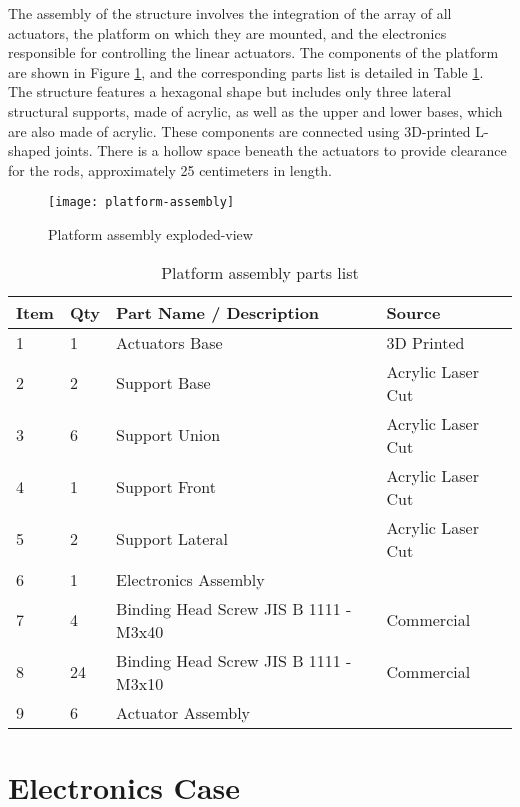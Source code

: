 The assembly of the structure involves the integration of the array of all actuators, the platform on which they are mounted, and the electronics responsible for controlling the linear actuators. The components of the platform are shown in Figure \ref{fig:platform-assembly}, and the corresponding parts list is detailed in Table \ref{tab:platform-assembly}. The structure features a hexagonal shape but includes only three lateral structural supports, made of acrylic, as well as the upper and lower bases, which are also made of acrylic. These components are connected using 3D-printed L-shaped joints. There is a hollow space beneath the actuators to provide clearance for the rods, approximately 25 centimeters in length.


\begin{figure}
    \centering
    \texttt{[image: platform-assembly]}
    \caption{Platform assembly exploded-view}
    \label{fig:platform-assembly}
\end{figure}

\begin{table}[]
    \centering
    \caption{Platform assembly parts list}
    \label{tab:platform-assembly}
    \begin{tabular}{llll}
    \toprule
    Item & Qty & Part Name / Description & Source \\
    \midrule
    1 & 1 & Actuators Base & 3D Printed \\
    2 & 2 & Support Base & Acrylic Laser Cut \\
    3 & 6 & Support Union & Acrylic Laser Cut \\
    4 & 1 & Support Front & Acrylic Laser Cut \\
    5 & 2 & Support Lateral & Acrylic Laser Cut \\
    6 & 1 & Electronics Assembly & \\
    7 & 4 & Binding Head Screw JIS B 1111 - M3x40 & Commercial \\
    8 & 24 & Binding Head Screw JIS B 1111 - M3x10 & Commercial \\
    9 & 6 & Actuator Assembly & \\
    \bottomrule
    \end{tabular}
\end{table}


\section{Electronics Case}

